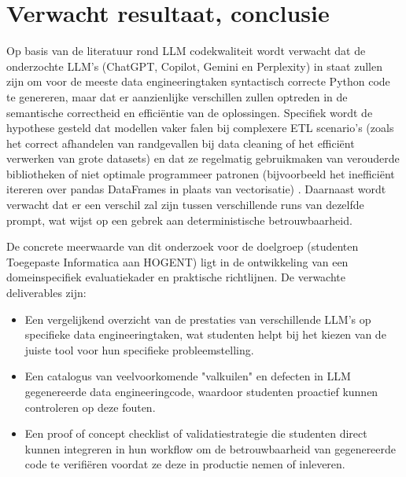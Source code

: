 \documentclass{hogent-article}
\begin{document}
\section{Verwacht resultaat, conclusie}%
\label{sec:verwachte_resultaten}

Op basis van de literatuur rond LLM codekwaliteit wordt verwacht dat de onderzochte LLM's (ChatGPT, Copilot, Gemini en Perplexity) in staat zullen zijn om voor de meeste data engineeringtaken syntactisch correcte Python code te genereren, maar dat er aanzienlijke verschillen zullen optreden in de semantische correctheid en efficiëntie van de oplossingen. Specifiek wordt de hypothese gesteld dat modellen vaker falen bij complexere ETL scenario's (zoals het correct afhandelen van randgevallen bij data cleaning of het efficiënt verwerken van grote datasets) en dat ze regelmatig gebruikmaken van verouderde bibliotheken of niet optimale programmeer patronen (bijvoorbeeld het inefficiënt itereren over pandas DataFrames in plaats van vectorisatie) \autocite{Esfahani2024}. Daarnaast wordt verwacht dat er een verschil zal zijn tussen verschillende runs van dezelfde prompt, wat wijst op een gebrek aan deterministische betrouwbaarheid.

De concrete meerwaarde van dit onderzoek voor de doelgroep (studenten Toegepaste Informatica aan HOGENT) ligt in de ontwikkeling van een domeinspecifiek evaluatiekader en praktische richtlijnen. De verwachte deliverables zijn:
\begin{itemize}
    \item Een vergelijkend overzicht van de prestaties van verschillende LLM's op specifieke data engineeringtaken, wat studenten helpt bij het kiezen van de juiste tool voor hun specifieke probleemstelling.
    \item Een catalogus van veelvoorkomende "valkuilen" en defecten in LLM gegenereerde data engineeringcode, waardoor studenten proactief kunnen controleren op deze fouten.
    \item Een proof of concept checklist of validatiestrategie die studenten direct kunnen integreren in hun workflow om de betrouwbaarheid van gegenereerde code te verifiëren voordat ze deze in productie nemen of inleveren.
\end{itemize}


\printbibliography[heading=bibintoc]
\end{document}
